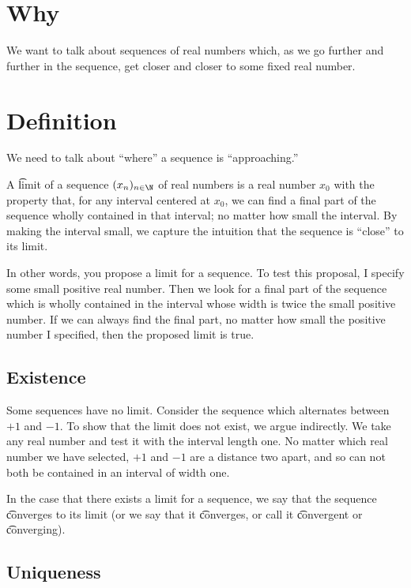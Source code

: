 
\section*{Why}

We want to talk about sequences of real numbers which, as we go further and further in the sequence, get closer and closer to some fixed real number.

\section*{Definition}

We need to talk about ``where'' a sequence is ``approaching.''

A \t{limit} of a sequence $(x_n)_{n \in \N  }$ of real numbers is a real number $x_0$ with the property that, for any interval centered at $x_0$, we can find a final part of the sequence wholly contained in that interval; no matter how small the interval.
By making the interval small, we capture the intuition that the sequence is ``close'' to its limit.

In other words, you propose a limit for a sequence.
To test this proposal, I specify some small positive real number.
Then we look for a final part of the sequence which is wholly contained in the interval whose width is twice the small positive number.
If we can always find the final part, no matter how small the positive number I specified, then the proposed limit is true.

\subsection*{Existence}

Some sequences have no limit.
Consider the sequence which alternates between $+1$ and $-1$.
To show that the limit does not exist, we argue indirectly.
We take any real number and test it with the interval length one.
No matter which real number we have selected, $+1$ and $-1$ are a distance two apart, and so can not both be contained in an interval of width one.

In the case that there exists a limit for a sequence, we say that the sequence \t{converges to} its limit (or we say that it \t{converges}, or call it \t{convergent} or \t{converging}).

\subsection*{Uniqueness}

